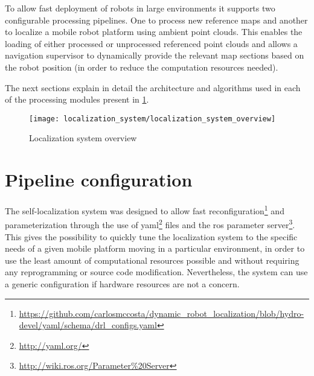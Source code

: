 To allow fast deployment of robots in large environments it supports two configurable processing pipelines. One to process new reference maps and another to localize a mobile robot platform using ambient point clouds. This enables the loading of either processed or unprocessed referenced point clouds and allows a navigation supervisor to dynamically provide the relevant map sections based on the robot position (in order to reduce the computation resources needed).

The next sections explain in detail the architecture and algorithms used in each of the processing modules present in \cref{fig:localization-system_localization-system-overview}.


\begin{figure}[H]
	\centering
	\texttt{[image: localization\_system/localization\_system\_overview]}
	\caption{Localization system overview}
	\label{fig:localization-system_localization-system-overview}
\end{figure}



\section{Pipeline configuration}

The self-localization system was designed to allow fast reconfiguration\footnote{\url{https://github.com/carlosmccosta/dynamic_robot_localization/blob/hydro-devel/yaml/schema/drl_configs.yaml}} and parameterization through the use of yaml\footnote{\url{http://yaml.org/}} files and the \gls{ros} parameter server\footnote{\url{http://wiki.ros.org/Parameter\%20Server}}. This gives the possibility to quickly tune the localization system to the specific needs of a given mobile platform moving in a particular environment, in order to use the least amount of computational resources possible and without requiring any reprogramming or source code modification. Nevertheless, the system can use a generic configuration if hardware resources are not a concern.

